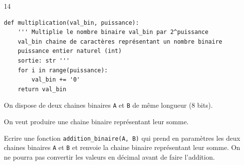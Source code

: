\documentclass[a4paper,10pt]{report}
\def\ptsexoK{1}
\begin{document}
    \medskip

     \exods{\ptsexoK}

    \begin{answer}{1}{4}
\begin{verbatim}
def multiplication(val_bin, puissance):
    ''' Multiplie le nombre binaire val_bin par 2^puissance
    val_bin chaine de caractères représentant un nombre binaire
    puissance entier naturel (int)
    sortie: str '''
    for i in range(puissance):
        val_bin += '0'
    return val_bin
\end{verbatim}

    \end{answer}

    \pagebreak
    \thispagestyle{DS_LP}


    On dispose de deux chaines binaires \verb|A| et \verb|B| de même longueur (8 bits).

    On veut produire une chaine binaire représentant leur somme.

    Ecrire une fonction \verb|addition_binaire(A, B)| qui prend en paramètres les deux chaines binaires \verb|A| et \verb|B| et renvoie la chaine binaire représentant leur somme. On ne pourra pas convertir les valeurs en décimal avant de faire l'addition.
\end{document}
